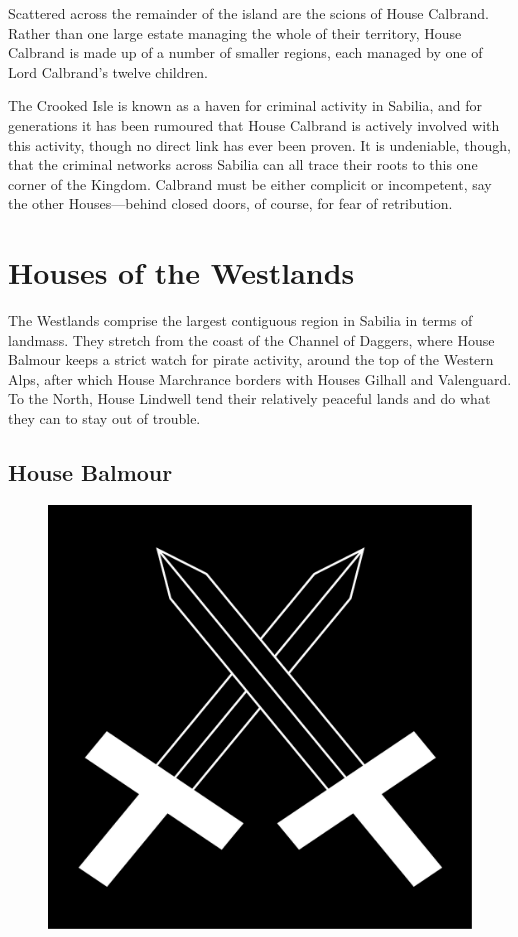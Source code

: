 \documentclass[10pt,twoside,openright,a4paper,twocolumn]{book}
\begin{document}
\noindent
Scattered across the remainder of the island are the scions of House Calbrand.
Rather than one large estate managing the whole of their territory, House
Calbrand is made up of a number of smaller regions, each managed by one of
Lord Calbrand's twelve children.

The Crooked Isle is known as a haven for criminal activity in Sabilia, and for
generations it has been rumoured that House Calbrand is actively involved with
this activity, though no direct link has ever been proven.  It is undeniable,
though, that the criminal networks across Sabilia can all trace their roots to
this one corner of the Kingdom.  Calbrand must be either complicit or
incompetent, say the other Houses---behind closed doors, of course, for fear of
retribution.

\section{Houses of the Westlands}

The Westlands comprise the largest contiguous region in Sabilia in terms of
landmass.  They stretch from the coast of the Channel of Daggers, where House
Balmour keeps a strict watch for pirate activity, around the top of the Western
Alps, after which House Marchrance borders with Houses Gilhall and Valenguard.
To the North, House Lindwell tend their relatively peaceful lands and do what they
can to stay out of trouble.

\subsection*{House Balmour}

\begin{figure}
  \includegraphics[width=0.48\columnwidth]{images/HouseBalmour}
\end{figure}
\end{document}
